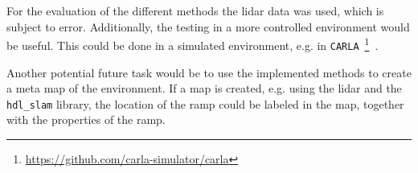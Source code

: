 For the evaluation of the different methods the \gls{lidar} data was used, which is subject to error.
Additionally, the testing in a more controlled environment would be useful.
This could be done in a simulated environment, e.g. in \texttt{CARLA}~\footnote{\url{https://github.com/carla-simulator/carla}}~\cite{Dosovitskiy2017}.

Another potential future task would be to use the implemented methods to create a meta map of the environment.
If a map is created, e.g. using the \gls{lidar} and the \texttt{hdl\_slam} library, the location of the ramp could be labeled in the map, together with the properties of the ramp.




